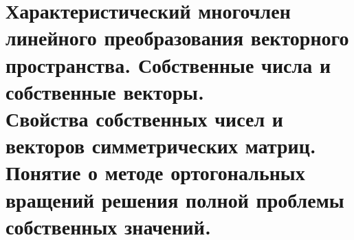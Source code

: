 \section{
    Характеристический многочлен линейного преобразования векторного \\
    пространства. Собственные числа и собственные векторы. \\
    Свойства собственных чисел и векторов симметрических матриц. \\
    Понятие о методе ортогональных вращений решения полной проблемы собственных значений. 
}

